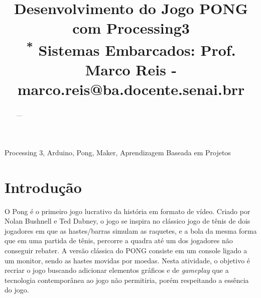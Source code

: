 \documentclass[conference]{IEEEtran}
\begin{document}
\title{Desenvolvimento do Jogo PONG com Processing3\\
{\footnotesize \textsuperscript{*} Sistemas Embarcados: Prof. Marco Reis - marco.reis@ba.docente.senai.brr}
}




\author{
\and
{}
\and
{}
}

\maketitle

\begin{abstract}
---
\end{abstract}

\begin{IEEEkeywords}
Processing 3, Arduino, Pong, Maker, Aprendizagem Baseada em Projetos
\end{IEEEkeywords}

\section{Introdução}
O Pong é o primeiro jogo lucrativo da história em formato de vídeo. Criado por  Nolan Bushnell e Ted Dabney, o jogo se inspira no clássico jogo de tênis de dois jogadores em que as hastes/barras simulam as raquetes, e a bola da mesma forma que em uma partida de tênis, percorre a quadra até um dos jogadores não conseguir rebater\cite{TechTudo}. A versão clássica do PONG consiste em um console ligado a um monitor, sendo as hastes movidas por moedas. Nesta atividade, o objetivo é recriar o jogo buscando adicionar elementos gráficos e de \textit{gameplay} que a tecnologia contemporânea ao jogo não permitiria, porém respeitando a essência do jogo.
\end{document}
